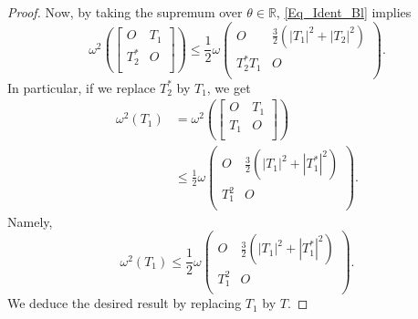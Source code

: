 \documentclass[10pt,a4paper]{amsart}
\begin{document}
\begin{proof}
Now, by taking the supremum over $\theta \in \mathbb{R}$, \eqref{Eq_Ident_Bl} implies
	\[{{\omega }^{2}}\left( \left[ \begin{matrix}
   O & {{T}_{1}}  \\
   T_{2}^{*} & O  \\
\end{matrix} \right] \right)\le \frac{1}{2}\omega \left( \begin{matrix}
   O & \frac{3}{2}\left( {{\left| {{T}_{1}} \right|}^{2}}+{{\left| {{T}_{2}} \right|}^{2}} \right)  \\
   T_{2}^{*}{{T}_{1}} & O  \\
\end{matrix} \right).\]
In particular, if we replace $T_{2}^{*}$ by ${{T}_{1}}$, we get
	\[\begin{aligned}
   {{\omega }^{2}}\left( {{T}_{1}} \right)&={{\omega }^{2}}\left( \left[ \begin{matrix}
   O & {{T}_{1}}  \\
   {{T}_{1}} & O  \\
\end{matrix} \right] \right) \\ 
 & \le \frac{1}{2}\omega \left( \begin{matrix}
   O & \frac{3}{2}\left( {{\left| {{T}_{1}} \right|}^{2}}+{{\left| T_{1}^{*} \right|}^{2}} \right)  \\
   T_{1}^{2} & O  \\
\end{matrix} \right).  
\end{aligned}\]
Namely,
	\[{{\omega }^{2}}\left( {{T}_{1}} \right)\le \frac{1}{2}\omega \left( \begin{matrix}
   O & \frac{3}{2}\left( {{\left| {{T}_{1}} \right|}^{2}}+{{\left| T_{1}^{*} \right|}^{2}} \right)  \\
   T_{1}^{2} & O  \\
\end{matrix} \right).\]
We deduce the desired result by replacing $T_1$ by $T$.
\end{proof}	
\end{document}
